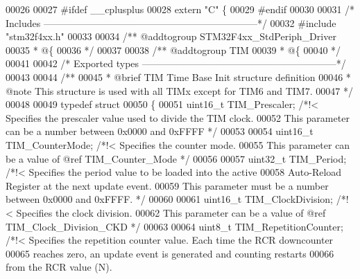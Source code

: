 \begin{DoxyCode}
00026 
00027 \textcolor{preprocessor}{#}\textcolor{preprocessor}{ifdef} \_\_cplusplus
00028  \textcolor{keyword}{extern} \textcolor{stringliteral}{"C"} \{
00029 \textcolor{preprocessor}{#}\textcolor{preprocessor}{endif}
00030 
00031 \textcolor{comment}{/* Includes ------------------------------------------------------------------*/}
00032 \textcolor{preprocessor}{#}\textcolor{preprocessor}{include} "stm32f4xx.h"
00033 
00034 \textcolor{comment}{/** @addtogroup STM32F4xx\_StdPeriph\_Driver}
00035 \textcolor{comment}{  * @\{}
00036 \textcolor{comment}{  */}
00037 
00038 \textcolor{comment}{/** @addtogroup TIM}
00039 \textcolor{comment}{  * @\{}
00040 \textcolor{comment}{  */}
00041 
00042 \textcolor{comment}{/* Exported types ------------------------------------------------------------*/}
00043 
00044 \textcolor{comment}{/** }
00045 \textcolor{comment}{  * @brief  TIM Time Base Init structure definition  }
00046 \textcolor{comment}{  * @note   This structure is used with all TIMx except for TIM6 and TIM7.  }
00047 \textcolor{comment}{  */}
00048 
00049 \textcolor{keyword}{typedef} \textcolor{keyword}{struct}
00050 \{
00051   uint16\_t TIM_Prescaler;         \textcolor{comment}{/*!< Specifies the prescaler value used to divide the TIM clock.}
00052 \textcolor{comment}{                                       This parameter can be a number between 0x0000 and 0xFFFF */}
00053 
00054   uint16\_t TIM_CounterMode;       \textcolor{comment}{/*!< Specifies the counter mode.}
00055 \textcolor{comment}{                                       This parameter can be a value of @ref TIM\_Counter\_Mode */}
00056 
00057   uint32\_t TIM_Period;            \textcolor{comment}{/*!< Specifies the period value to be loaded into the active}
00058 \textcolor{comment}{                                       Auto-Reload Register at the next update event.}
00059 \textcolor{comment}{                                       This parameter must be a number between 0x0000 and 0xFFFF.  */}
00060 
00061   uint16\_t TIM_ClockDivision;     \textcolor{comment}{/*!< Specifies the clock division.}
00062 \textcolor{comment}{                                      This parameter can be a value of @ref TIM\_Clock\_Division\_CKD */}
00063 
00064   uint8\_t TIM_RepetitionCounter;  \textcolor{comment}{/*!< Specifies the repetition counter value. Each time the RCR
       downcounter}
00065 \textcolor{comment}{                                       reaches zero, an update event is generated and counting
       restarts}
00066 \textcolor{comment}{                                       from the RCR value (N).}

\end{DoxyCode}
